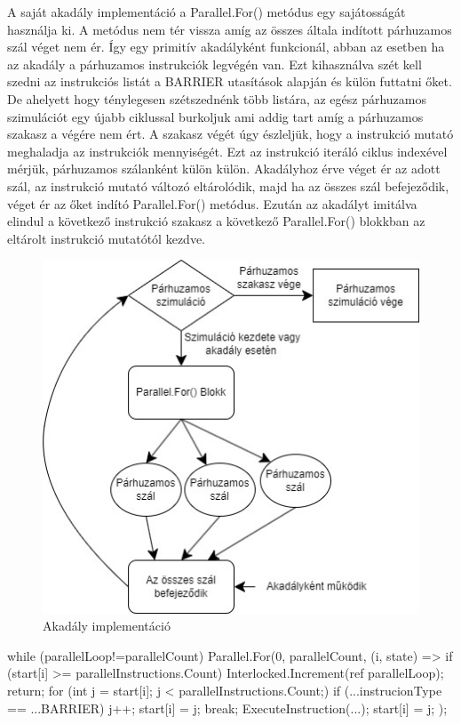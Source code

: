 A saját akadály implementáció a Parallel.For() metódus egy sajátosságát használja ki. A metódus nem tér vissza amíg az összes általa indított párhuzamos szál véget nem ér. Így egy primitív akadályként funkcionál, abban az esetben ha az akadály a párhuzamos instrukciók legvégén van. Ezt kihasználva szét kell szedni az instrukciós listát a BARRIER utasítások alapján és külön futtatni őket. De ahelyett hogy ténylegesen szétszednénk több listára, az egész párhuzamos szimulációt egy újabb ciklussal burkoljuk ami addig tart amíg a párhuzamos szakasz a végére nem ért. A szakasz végét úgy észleljük, hogy a instrukció mutató meghaladja az instrukciók mennyiségét. Ezt az instrukció iteráló ciklus indexével mérjük, párhuzamos szálanként külön külön. Akadályhoz érve véget ér az adott szál, az instrukció mutató változó eltárolódik, majd ha az összes szál befejeződik, véget ér az őket indító Parallel.For() metódus. Ezután az akadályt imitálva elindul a következő instrukció szakasz a következő Parallel.For() blokkban az eltárolt instrukció mutatótól kezdve. 

\begin{figure}[h]
\centering
\includegraphics[scale=0.7]{images/Barrier.jpg}
\caption{Akadály implementáció}
\label{fig:Barrier}
\end{figure}

\begin{cpp}
while (parallelLoop!=parallelCount)
      {
           Parallel.For(0, parallelCount, (i, state) =>
           {
               if (start[i] >= parallelInstructions.Count)
               {
                   Interlocked.Increment(ref parallelLoop);
                   return;
               } 
               for (int j = start[i]; j < parallelInstructions.Count;)
               {
                   if (...instrucionType == ...BARRIER)
                      {
                          j++;
                          start[i] = j;
                          break;
                      }
                   ExecuteInstruction(...);
                   start[i] = j;
                }
            });
      }
\end{cpp}

